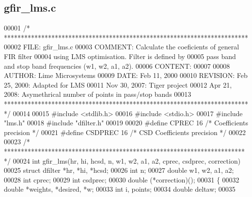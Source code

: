 \subsection{gfir\+\_\+lms.\+c}
\label{gfir__lms_8c_source}

\begin{DoxyCode}
00001 \textcolor{comment}{/* ************************************************************************ }
00002 \textcolor{comment}{   FILE:        gfir\_lms.c}
00003 \textcolor{comment}{   COMMENT:     Calculate the coeficients of general FIR filter}
00004 \textcolor{comment}{            using LMS optimisation. Filter is defined by}
00005 \textcolor{comment}{            pass band and stop band frequencies (w1, w2, a1, a2).}
00006 \textcolor{comment}{   CONTENT:}
00007 \textcolor{comment}{}
00008 \textcolor{comment}{   AUTHOR:      Lime Microsystems}
00009 \textcolor{comment}{   DATE:        Feb 11, 2000}
00010 \textcolor{comment}{   REVISION:        Feb 25, 2000: Adapted for LMS}
00011 \textcolor{comment}{            Nov 30, 2007: Tiger project}
00012 \textcolor{comment}{            Apr 21, 2008: Asymethrical number of points in pass/stop bands}
00013 \textcolor{comment}{   ************************************************************************ */}
00014 
00015 \textcolor{preprocessor}{#include <stdlib.h>}
00016 \textcolor{preprocessor}{#include <stdio.h>}
00017 \textcolor{preprocessor}{#include "lms.h"}
00018 \textcolor{preprocessor}{#include "dfilter.h"}
00019 
00020 \textcolor{preprocessor}{#define CPREC       16  }\textcolor{comment}{/* Coefficients precision */}\textcolor{preprocessor}{}
00021 \textcolor{preprocessor}{#define CSDPREC     16  }\textcolor{comment}{/* CSD Coefficients precision */}\textcolor{preprocessor}{}
00022 
00023 \textcolor{comment}{/* *********************************************************************** */}
00024 \textcolor{keywordtype}{int} gfir_lms(hr, hi, hcsd, n, w1, w2, a1, a2, cprec, csdprec, correction)
00025   struct dfilter *hr, *hi, *hcsd;
00026 \textcolor{keywordtype}{int} n;
00027 \textcolor{keywordtype}{double} w1, w2, a1, a2;
00028 \textcolor{keywordtype}{int} cprec;
00029 \textcolor{keywordtype}{int} csdprec;
00030 \textcolor{keywordtype}{double} (*correction)();
00031 \{
00032   \textcolor{keywordtype}{double} *weights, *desired, *w;
00033   \textcolor{keywordtype}{int} i, points;
00034   \textcolor{keywordtype}{double} deltaw;
00035 

\end{DoxyCode}

